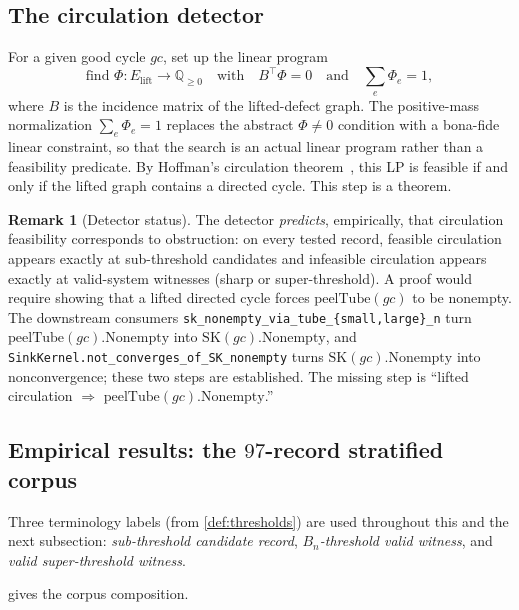 \documentclass[11pt,a4paper]{article}
\theoremstyle{plain}
\theoremstyle{definition}
\newtheorem{remark}[theorem]{Remark}
\newcommand{\Bn}{B_n}
\newcommand{\SK}{\mathrm{SK}}
\newcommand{\peelTube}{\mathrm{peelTube}}
\begin{document}
\subsection{The circulation detector}\label{sec:detector-lp}

For a given good cycle $gc$, set up the linear program
\[
   \text{find }\Phi : E_{\mathrm{lift}} \to \mathbb{Q}_{\ge 0}
   \quad\text{with}\quad B^\top \Phi = 0
   \quad\text{and}\quad \textstyle\sum_{e} \Phi_e = 1,
\]
where $B$ is the incidence matrix of the lifted-defect graph.  The
positive-mass normalization $\sum_e \Phi_e = 1$ replaces the abstract
$\Phi \ne 0$ condition with a bona-fide linear constraint, so that the
search is an actual linear program rather than a feasibility predicate.
By Hoffman's circulation theorem~\cite{Hoffman1960}, this LP is
feasible if and only if the lifted graph contains a directed cycle.
This step is a theorem.

\begin{remark}[Detector status]\label{rem:detector-status}
The detector \emph{predicts}, empirically, that circulation feasibility
corresponds to obstruction: on every tested record, feasible circulation
appears exactly at sub-threshold candidates and infeasible circulation
appears exactly at valid-system witnesses (sharp or super-threshold).
A proof would require showing that a lifted directed cycle forces
$\peelTube(gc)$ to be nonempty.  The downstream consumers
\texttt{sk\_nonempty\_via\_tube\_\{small,large\}\_n} turn
$\peelTube(gc).\mathrm{Nonempty}$ into $\SK(gc).\mathrm{Nonempty}$, and
\texttt{SinkKernel.not\_converges\_of\_SK\_nonempty} turns
$\SK(gc).\mathrm{Nonempty}$ into nonconvergence; these two steps are
established.  The missing step is
``lifted circulation $\Rightarrow$ $\peelTube(gc).\mathrm{Nonempty}$.''
\end{remark}

\subsection{Empirical results: the $97$-record stratified corpus}\label{sec:detector-corpus}

Three terminology labels (from \cref{def:thresholds}) are used
throughout this and the next subsection:
\emph{sub-threshold candidate record},
\emph{$\Bn$-threshold valid witness}, and
\emph{valid super-threshold witness}.

 gives the corpus composition.
\end{document}
